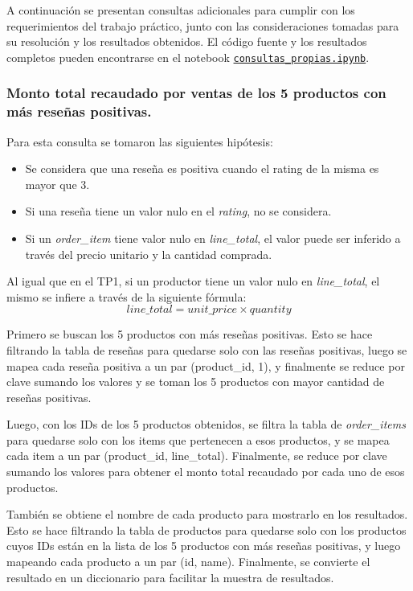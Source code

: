 A continuación se presentan consultas adicionales para cumplir con los requerimientos del trabajo práctico, junto con las consideraciones tomadas para su resolución y los resultados obtenidos. El código fuente y los resultados completos pueden encontrarse en el notebook \href{https://github.com/patricioibar/datos-tp2/blob/main/consultas_propias.ipynb}{\texttt{consultas\_propias.ipynb}}.

\subsubsection{Monto total recaudado por ventas de los 5 productos con más reseñas positivas.}
Para esta consulta se tomaron las siguientes hipótesis:
\begin{itemize}
    \item Se considera que una reseña es positiva cuando el rating de la misma es mayor que 3.
    \item Si una reseña tiene un valor nulo en el \textit{rating}, no se considera.
    \item Si un \textit{order\_item} tiene valor nulo en \textit{line\_total}, el valor puede ser inferido a través del precio unitario y la cantidad comprada.
\end{itemize}

Al igual que en el TP1, si un productor tiene un valor nulo en \textit{line\_total}, el mismo se infiere a través de la siguiente fórmula:
\[line\_total = unit\_price \times quantity\]

Primero se buscan los 5 productos con más reseñas positivas. Esto se hace filtrando la tabla de reseñas para quedarse solo con las reseñas positivas, luego se mapea cada reseña positiva a un par (product\_id, 1), y finalmente se reduce por clave sumando los valores y se toman los 5 productos con mayor cantidad de reseñas positivas.

Luego, con los IDs de los 5 productos obtenidos, se filtra la tabla de \textit{order\_items} para quedarse solo con los items que pertenecen a esos productos, y se mapea cada item a un par (product\_id, line\_total). Finalmente, se reduce por clave sumando los valores para obtener el monto total recaudado por cada uno de esos productos.

También se obtiene el nombre de cada producto para mostrarlo en los resultados. Esto se hace filtrando la tabla de productos para quedarse solo con los productos cuyos IDs están en la lista de los 5 productos con más reseñas positivas, y luego mapeando cada producto a un par (id, name). Finalmente, se convierte el resultado en un diccionario para facilitar la muestra de resultados.

